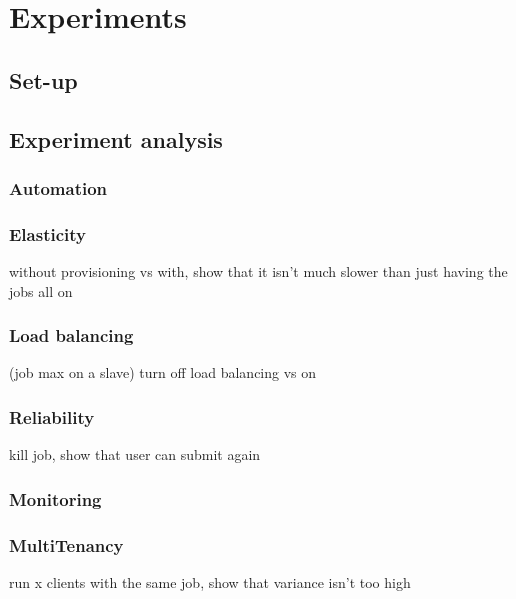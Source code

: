 \section{Experiments}
\label{exp}

\subsection{Set-up}
\subsection{Experiment analysis}

\subsubsection{Automation}

\subsubsection{Elasticity}

without provisioning vs with, show that it isn't much slower than just having the jobs all on

\subsubsection{Load balancing}

(job max on a slave)
turn off load balancing vs on
\subsubsection{Reliability}

kill job, show that user can submit again
\subsubsection{Monitoring}

\subsubsection{MultiTenancy}
run x clients with the same job, show that variance isn't too high
